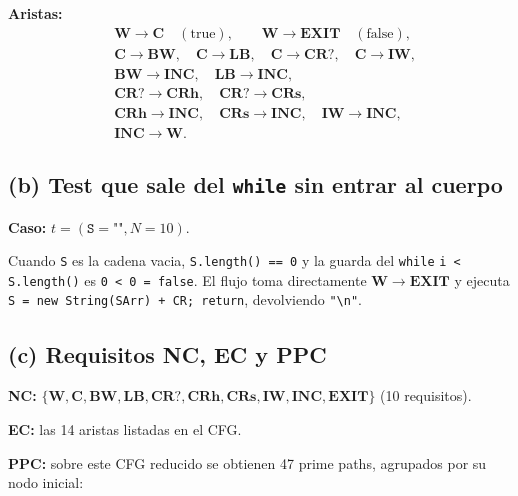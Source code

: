 \documentclass[12pt,a4paper]{article}
\begin{document}
\textbf{Aristas:}
\[
\begin{aligned}
&\mathbf{W} \to \mathbf{C} \quad (\text{true}), \qquad \mathbf{W} \to \mathbf{EXIT} \quad (\text{false}), \\
&\mathbf{C} \to \mathbf{BW},\quad \mathbf{C} \to \mathbf{LB},\quad \mathbf{C} \to \mathbf{CR?},\quad \mathbf{C} \to \mathbf{IW}, \\
&\mathbf{BW} \to \mathbf{INC},\quad \mathbf{LB} \to \mathbf{INC}, \\
&\mathbf{CR?} \to \mathbf{CRh},\quad \mathbf{CR?} \to \mathbf{CRs}, \\
&\mathbf{CRh} \to \mathbf{INC},\quad \mathbf{CRs} \to \mathbf{INC},\quad \mathbf{IW} \to \mathbf{INC}, \\
&\mathbf{INC} \to \mathbf{W}.
\end{aligned}
\]

\subsection{(b) Test que sale del \texttt{while} sin entrar al cuerpo}

\textbf{Caso:} $t = (\texttt{S}=\texttt{""}, N=10)$.

Cuando \texttt{S} es la cadena vacia, \texttt{S.length() == 0} y la guarda del \texttt{while}
\texttt{i < S.length()} es \texttt{0 < 0 = false}. El flujo toma directamente
$\mathbf{W} \to \mathbf{EXIT}$ y ejecuta \texttt{S = new String(SArr) + CR; return}, devolviendo
\texttt{"\textbackslash n"}.

\subsection{(c) Requisitos NC, EC y PPC}

\textbf{NC:} $\{\mathbf{W}, \mathbf{C}, \mathbf{BW}, \mathbf{LB}, \mathbf{CR?}, \mathbf{CRh},
\mathbf{CRs}, \mathbf{IW}, \mathbf{INC}, \mathbf{EXIT}\}$ (10 requisitos).

\textbf{EC:} las 14 aristas listadas en el CFG.

\textbf{PPC:} sobre este CFG reducido se obtienen 47 prime paths, agrupados por su nodo inicial:
\end{document}
